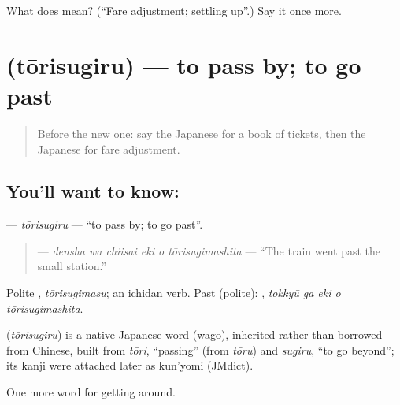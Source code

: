 \begin{tcolorbox}[breakable,colback=teal!4,colframe=teal!35!black,title={Before you move on}]
What does  mean? (\textquotedblleft{}Fare adjustment; settling up\textquotedblright{}.) Say it once more.
\end{tcolorbox}
\section[\texorpdfstring{\ja{とおりすぎる} (tōrisugiru)}{とおりすぎる (tōrisugiru)}]{ (tōrisugiru) — to pass by; to go past}

\label{lesson:JA-C373-tourisugiru}



\begin{quote}
Before the new one: say the Japanese for a book of tickets, then the Japanese for fare adjustment.
\end{quote}

\subsection*{You'll want to know: }
\textbf{} — \emph{tōrisugiru} — \textquotedblleft{}to pass by; to go past\textquotedblright{}.

\begin{quote}
\textbf{   } — \emph{densha wa chiisai eki o tōrisugimashita} — \textquotedblleft{}The train went past the small station.\textquotedblright{}
\end{quote}

Polite \textbf{}, \emph{tōrisugimasu}; an ichidan verb. Past (polite): \textbf{  }, \emph{tokkyū ga eki o tōrisugimashita}.

\begin{cousinweb}
\textbf{} (\emph{tōrisugiru}) is a native Japanese word (wago), inherited rather than borrowed from Chinese, built from \emph{tōri}, \textquotedblleft{}passing\textquotedblright{} (from \emph{tōru}) and \emph{sugiru}, \textquotedblleft{}to go beyond\textquotedblright{}; its kanji were attached later as kun'yomi (JMdict).
\end{cousinweb}

\begin{grammarlens}[title={What you've built}]
One more word for getting around.
\end{grammarlens}

